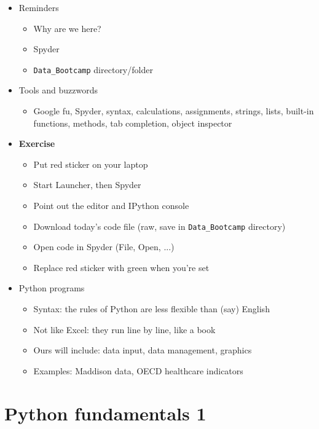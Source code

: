 \documentclass[11pt]{article}
\begin{document}
\begin{itemize}

\item Reminders
\begin{itemize}
\item Why are we here?
\item Spyder
\item \verb|Data_Bootcamp| directory/folder
\end{itemize}

\item Tools and buzzwords
\begin{itemize}
\item Google fu, Spyder, syntax, calculations, assignments, strings, lists, built-in functions, methods, tab completion, object inspector
\end{itemize}

\item {\bf Exercise}
\begin{itemize}
\item Put red sticker on your laptop
\item Start Launcher, then Spyder
\item Point out the editor and IPython console
\item Download today's code file (raw, save in \verb|Data_Bootcamp| directory)
\item Open code in Spyder (File, Open, ...)
\item Replace red sticker with green when you're set
\end{itemize}

\item Python programs
\begin{itemize}
\item Syntax:  the rules of Python are less flexible than (say) English
\item Not like Excel: they run line by line, like a book
\item Ours will include:  data input, data management, graphics
\item Examples:  Maddison data, OECD healthcare indicators
\end{itemize}
\end{itemize}


\section*{Python fundamentals 1}
\end{document}
